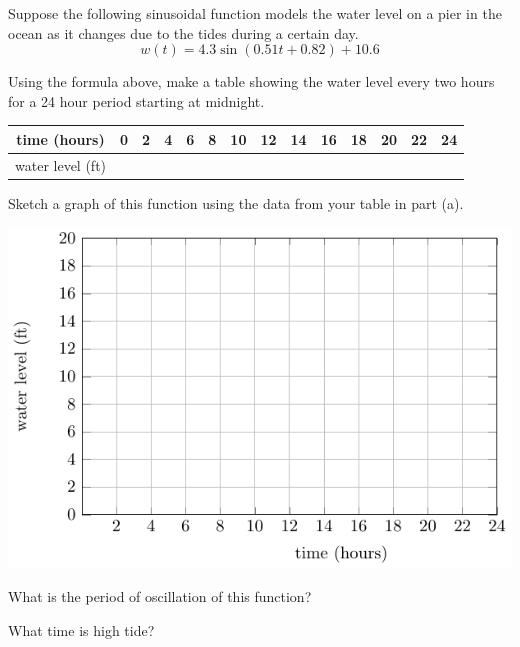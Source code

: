 \begin{activity}\label{A:0.5.3}
Suppose the following sinusoidal function models the water level on a pier in the ocean as
it changes due to the tides during a certain day.
\[ w(t) = 4.3 \sin \left( 0.51 t + 0.82 \right) + 10.6 \]
\ba
\item Using the formula above, make a table showing the water level every two hours for a 24 hour period starting at midnight.
    \begin{center}
        \begin{tabular}[h!]{|c||c|c|c|c|c|c|c|c|c|c|c|c|c|}
            \hline
            time (hours) & 0 & 2 & 4 & 6 & 8 & 10 & 12 & 14 & 16 & 18 & 20 & 22 & 24 \\
            \hline
            water level (ft) & & & & & & & & & & & & & \\ \hline
        \end{tabular}
    \end{center}
\item Sketch a graph of this function using the data from your table in part (a).
    \begin{center}
        \includegraphics[width=0.6\columnwidth]{figures/0-5-fig10.pdf}
    \end{center}
\item What is the period of oscillation of this function? %
\item What time is high tide?  %

\ea
\end{activity}\aftera
